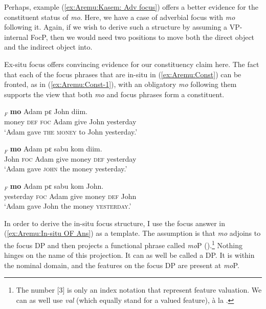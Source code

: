 \documentclass[output=paper,colorlinks,citecolor=brown,draftmode
]{langscibook}
\begin{document}
Perhaps, example (\ref{ex:Aremu:Kasem: Adv focus}) offers a better evidence for the constituent status of \textit{mo}. Here, we have a case of adverbial focus with \textit{mo} following it. Again, if we wish to derive such a structure by assuming a VP-internal FocP, then we would need two positions to move both the direct object and the indirect object into. 


Ex-situ focus offers convincing evidence for our constituency claim here. The fact that each of the focus phrases that are in-situ in (\ref{ex:Aremu:Const}) can be fronted, as in (\ref{ex:Aremu:Const-1}), with an obligatory \textit{mo} following them supports the view that both \textit{mo} and focus phrases form a constituent.

\ea \label{ex:Aremu:Const-1}
\begin{xlist}

\ex \label{ex:Aremu:Kasem: Ex-situ DO focus}
$_F$ \textbf{mo} Adam pɛ  John diim.\\
	  money \textsc{def} \textsc{foc} Adam give John yesterday\\
\glt  `Adam gave \textsc{the money} to John yesterday.'
    
\ex \label{ex:Aremu:Kasem: Ex-situ IO focus}
\gll [John]$_F$ \textbf{mo} Adam pɛ sabu kom diim.\\
	  John \textsc{foc} Adam give money \textsc{def} yesterday\\
\glt `Adam gave \textsc{john} the money yesterday.'

\ex \label{ex:Aremu:Kasem: Ex-situ Adv focus}
\gll [Diim]$_F$ \textbf{mo} Adam pɛ sabu kom John.\\
	 yesterday \textsc{foc} Adam give money \textsc{def} John \\
\glt `Adam gave John the money \textsc{yesterday}.'

\end{xlist}
\z 


In order to derive the in-situ focus structure, I use the focus answer in (\ref{ex:Aremu:In-situ OF Ans}) as a template. The assumption is that \textit{mo} adjoins to the focus DP and then projects a functional phrase called \textit{mo}P ().\footnote{The number [3] is only an index notation that represent feature valuation. We can as well use \textit{val} (which equally stand for a valued feature), à la \citet{PesetskyTorrego2007}.} Nothing hinges on the name of this projection. It can as well be called a DP. It is within the nominal domain, and the features on the focus DP are present at \textit{mo}P.
\end{document}
